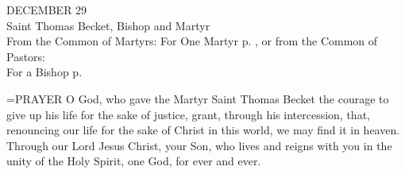 \begin{center}\normalsize DECEMBER 29\\
\footnotesize Saint Thomas Becket, Bishop and Martyr\\
\footnotesize From the Common of Martyrs: For One Martyr p.   , or from the Common of Pastors:\\
\footnotesize For a Bishop p.\\
\end{center}

\hangindent=\parindent \small{PRAYER 
O God, who gave the Martyr Saint Thomas Becket
the courage to give up his life for the sake of justice,
grant, through his intercession,
that, renouncing our life
for the sake of Christ in this world,
we may find it in heaven.
Through our Lord Jesus Christ, your Son,
who lives and reigns with you in the unity of the Holy Spirit,
one God, for ever and ever.\\}
 
